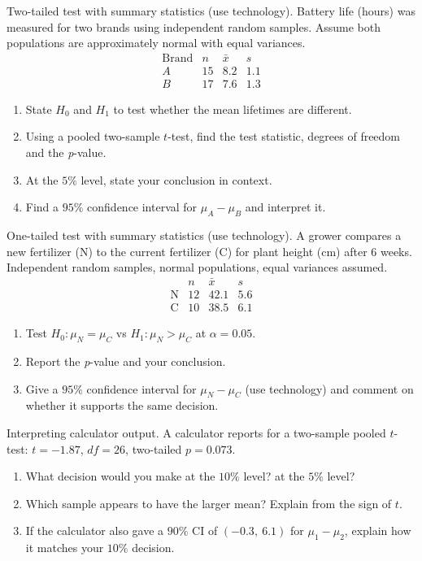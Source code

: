 \documentclass[11pt]{article}
\def\textbf#1{#1}%
\def\mathrm#1{#1}%
\newcounter{question}
\begin{document}
\begin{question}
\textbf{Two-tailed test with summary statistics (use technology).}
Battery life (hours) was measured for two brands using independent random samples.
Assume both populations are approximately normal with equal variances.
\[
\begin{array}{c|ccc}
\text{Brand} & n & \bar{x} & s \\
\hline
A & 15 & 8.2 & 1.1\\
B & 17 & 7.6 & 1.3
\end{array}
\]
\begin{enumerate}
  \item State $H_0$ and $H_1$ to test whether the mean lifetimes are different.
  \item Using a pooled two-sample $t$-test, find the test statistic, degrees of freedom and the \emph{p}-value.
  \item At the $5\%$ level, state your conclusion in context.
  \item Find a $95\%$ confidence interval for $\mu_A-\mu_B$ and interpret it.
\end{enumerate}
\end{question}

\begin{question}
\textbf{One-tailed test with summary statistics (use technology).}
A grower compares a new fertilizer (N) to the current fertilizer (C) for plant height (cm) after 6 weeks.
Independent random samples, normal populations, equal variances assumed.
\[
\begin{array}{c|ccc}
 & n & \bar{x} & s\\\hline
\text{N} & 12 & 42.1 & 5.6\\
\text{C} & 10 & 38.5 & 6.1
\end{array}
\]
\begin{enumerate}
  \item Test $H_0:\mu_N=\mu_C$ vs $H_1:\mu_N>\mu_C$ at $\alpha=0.05$.
  \item Report the \emph{p}-value and your conclusion.
  \item Give a $95\%$ confidence interval for $\mu_N-\mu_C$ (use technology) and comment on whether it supports the same decision.
\end{enumerate}
\end{question}

\begin{question}
\textbf{Interpreting calculator output.}
A calculator reports for a two-sample pooled $t$-test: $t=-1.87$, $\mathrm{df}=26$, two-tailed $p=0.073$.
\begin{enumerate}
  \item What decision would you make at the $10\%$ level? at the $5\%$ level?
  \item Which sample appears to have the larger mean? Explain from the sign of $t$.
  \item If the calculator also gave a $90\%$ CI of $(-0.3,\ 6.1)$ for $\mu_1-\mu_2$, explain how it matches your $10\%$ decision.
\end{enumerate}
\end{question}
\end{document}

